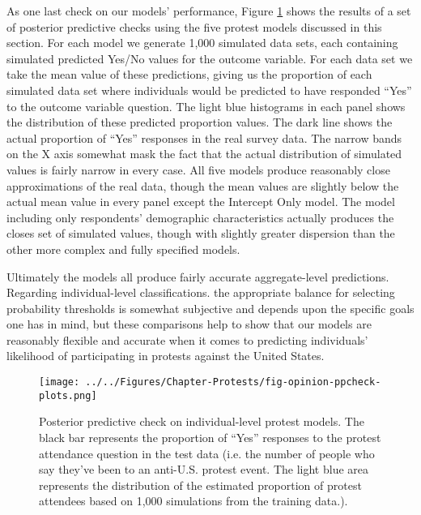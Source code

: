 As one last check on our models' performance, Figure \ref{fig:ppcheck-individual-protest} shows the results of a set of posterior predictive checks using the five protest models discussed in this section. For each model we generate 1,000 simulated data sets, each containing simulated predicted Yes/No values for the outcome variable. For each data set we take the mean value of these predictions, giving us the proportion of each simulated data set where individuals would be predicted to have responded ``Yes'' to the outcome variable question. The light blue histograms in each panel shows the distribution of these predicted proportion values. The dark line shows the actual proportion of ``Yes'' responses in the real survey data. The narrow bands on the X axis somewhat mask the fact that the actual distribution of simulated values is fairly narrow in every case. All five models produce reasonably close approximations of the real data, though the mean values are slightly below the actual mean value in every panel except the Intercept Only model. The model including only respondents' demographic characteristics actually produces the closes set of simulated values, though with slightly greater dispersion than the other more complex and fully specified models. 

Ultimately the models all produce fairly accurate aggregate-level predictions. Regarding individual-level classifications. the appropriate balance for selecting probability thresholds is somewhat subjective and depends upon the specific goals one has in mind, but these comparisons help to show that our models are reasonably flexible and accurate when it comes to predicting individuals' likelihood of participating in protests against the United States. 



\begin{figure}[t]
	\centering\texttt{[image: ../../Figures/Chapter-Protests/fig-opinion-ppcheck-plots.png]}
	\caption{Posterior predictive check on individual-level protest models. The black bar represents the proportion of ``Yes'' responses to the protest attendance question in the test data (i.e. the number of people who say they've been to an anti-U.S. protest event. The light blue area represents the distribution of the estimated proportion of protest attendees based on 1,000 simulations from the training data.).}
	\label{fig:ppcheck-individual-protest}
\end{figure}


